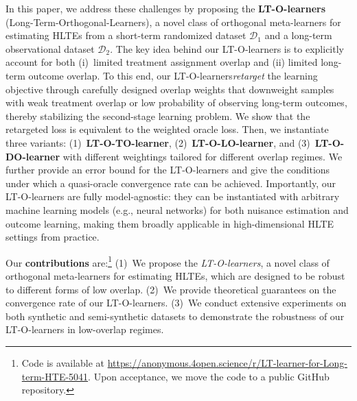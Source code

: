 \documentclass{article}
\theoremstyle{plain}
\theoremstyle{definition}
\theoremstyle{remark}
\newcommand{\1}{\mathds{1}}                %
\newcommand{\methods}{LT-O-learners\xspace}
\newcommand{\TO}{LT-O-TO-learner\xspace}
\newcommand{\LO}{LT-O-LO-learner\xspace}
\newcommand{\DO}{LT-O-DO-learner\xspace}
\begin{document}
In this paper, we address these challenges by proposing the \textbf{\methods} (Long-Term-Orthogonal-Learners), a novel class of orthogonal meta-learners for estimating HLTEs from a short-term randomized dataset $\mathcal{D}_1$ and a long-term observational dataset $\mathcal{D}_2$. The key idea behind our \methods is to explicitly account for both (i)~limited treatment assignment overlap and (ii) limited long-term outcome overlap. To this end, our \methods \textit{retarget} the learning objective through carefully designed overlap weights that downweight samples with weak treatment overlap or low probability of observing long-term outcomes, thereby stabilizing the second-stage learning problem. We show that the retargeted loss is equivalent to the weighted oracle loss. Then, we instantiate three variants: (1)~\textbf{\TO}, (2)~\textbf{\LO}, and (3)~\textbf{\DO} with different weightings tailored for different overlap regimes. We further provide an error bound for the \methods and give the conditions under which a quasi-oracle convergence rate can be achieved. Importantly, our \methods are fully model-agnostic: they can be instantiated with arbitrary machine learning models (e.g., neural networks) for both nuisance estimation and outcome learning, making them broadly applicable in high-dimensional HLTE settings from practice.



Our \textbf{contributions} are:\footnote{Code is available at \href{https://anonymous.4open.science/r/LT-learner-for-Long-term-HTE-5041}{https://anonymous.4open.science/r/LT-learner-for-Long-term-HTE-5041}. Upon acceptance, we move the code to a public GitHub repository.} (1)~We propose the \textit{\methods}, a novel class of orthogonal meta-learners for estimating HLTEs, which are designed to be robust to different forms of low overlap. (2)~We provide theoretical guarantees on the convergence rate of our \methods. (3)~We conduct extensive experiments on both synthetic and semi-synthetic datasets to demonstrate the robustness of our \methods in low-overlap regimes.
\end{document}
